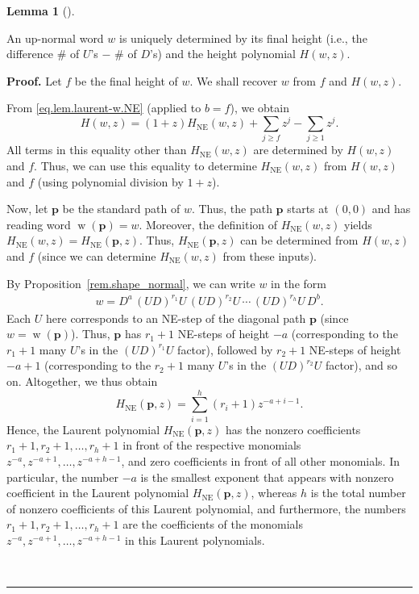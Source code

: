\documentclass[numbers=enddot,12pt,final,onecolumn,notitlepage]{scrartcl}%
\theoremstyle{definition}
\newtheorem{lem}[theo]{Lemma}
\newenvironment{lemma}[1][]
{\begin{lem}[#1]\begin{leftbar}}
{\end{leftbar}\end{lem}}
\newenvironment{proof}[1][Proof]{\noindent\textbf{#1.} }{\ \rule{0.5em}{0.5em}}
\newcommand{\pp}{\mathbf{p}}
\newcommand{\NE}{\operatorname{NE}}
\newcommand{\w}{\operatorname{w}}
\newcommand{\tup}[1]{\left( #1 \right)}
\newenvironment{verlong}{}{}
\begin{document}
\begin{lemma} \label{lem:unique}
An up-normal word $w$ is uniquely determined by its final height (i.e., the difference \# of $U$'s $-$ \# of $D$'s) and the height polynomial $H(w,z)$.
\end{lemma}

\begin{proof}
Let $f$ be the final height of $w$. We shall recover $w$ from $f$ and $H\tup{w,z}$.

From \eqref{eq.lem.laurent-w.NE} (applied to $b=f$), we obtain
\[
H(w,z) = (1+z)H_{\NE}(w,z) + \sum_{j \geq f} z^j - \sum_{j \geq 1} z^j .
\]
All terms in this equality other than $H_{\NE}(w,z)$ are determined by $H\tup{w,z}$ and $f$. %
Thus, we can use this equality to determine $H_{\NE}(w,z)$ from $H\tup{w,z}$ and $f$ (using polynomial division by $1+z$).

Now, let $\pp$ be the standard path of $w$. Thus, the path $\pp$ starts at $\tup{0,0}$ and has reading word $\w\tup{\pp} = w$.
Moreover, the definition of $H_{\NE}(w,z)$ yields $H_{\NE}(w,z) = H_{\NE}(\pp,z)$.
Thus, $H_{\NE}(\pp,z)$ can be determined from $H\tup{w,z}$ and $f$ (since we can determine $H_{\NE}(w,z)$ from these inputs).

By Proposition~\ref{rem.shape_normal}, we can write $w$ in the form
\begin{align}
w = D^a\, (UD)^{r_1}U\, (UD)^{r_2}U\,  \cdots\,  (UD)^{r_h}U\, D^b .
\label{eq.lem.unique.w=}
\end{align}
Each $U$ here corresponds to an NE-step of the diagonal path $\pp$ (since $w = \w\tup{\pp}$).
Thus, $\pp$ has $r_1+1$ NE-steps of height $-a$ (corresponding to the $r_1+1$ many $U$'s in the $(UD)^{r_1} U$ factor),
followed by $r_2+1$ NE-steps of height $-a+1$ (corresponding to the $r_2+1$ many $U$'s in the $(UD)^{r_2} U$ factor),
and so on.
Altogether, we thus obtain
\[
H_{\NE}\tup{\pp,z} = \sum_{i=1}^h (r_i+1)z^{-a+i-1}.
\]
\begin{verlong}
Hence, the Laurent polynomial $H_{\NE}\tup{\pp,z}$ has the nonzero coefficients $r_1+1, r_2+1, \ldots, r_h+1$ in front of the respective monomials $z^{-a}, z^{-a+1}, \ldots, z^{-a+h-1}$, and zero coefficients in front of all other monomials.
In particular, the number $-a$ is the smallest exponent that appears with nonzero coefficient in the Laurent polynomial $H_{\NE}\tup{\pp,z}$, whereas $h$ is the total number of nonzero coefficients of this Laurent polynomial, and furthermore, the numbers $r_1+1, r_2+1, \ldots, r_h+1$ are the coefficients of the monomials $z^{-a}, z^{-a+1}, \ldots, z^{-a+h-1}$ in this Laurent polynomials.
\end{verlong}


\end{proof}
\end{document}

